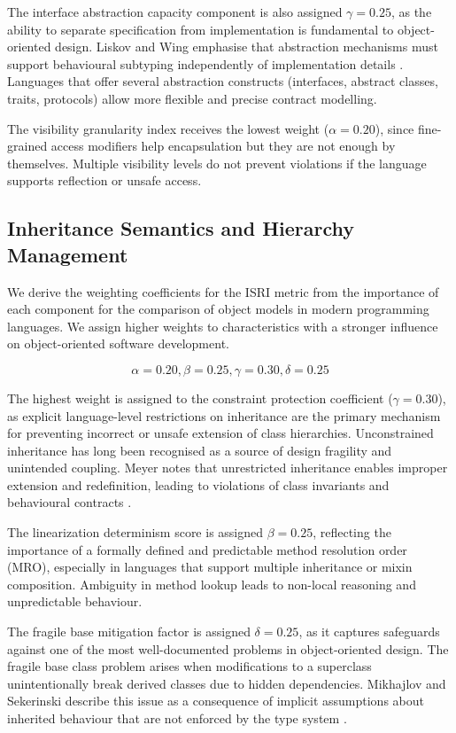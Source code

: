 The interface abstraction capacity component is also assigned $\gamma = 0.25$, as the ability to separate specification from implementation is fundamental to object-oriented design. Liskov and Wing emphasise that abstraction mechanisms must support behavioural subtyping independently of implementation details \cite{liskov1999behavioral}. Languages that offer several abstraction constructs (interfaces, abstract classes, traits, protocols) allow more flexible and precise contract modelling.

The visibility granularity index receives the lowest weight ($\alpha = 0.20$), since fine-grained access modifiers help encapsulation but they are not enough by themselves. Multiple visibility levels do not prevent violations if the language supports reflection or unsafe access.

\subsection{Inheritance Semantics and Hierarchy Management}

We derive the weighting coefficients for the ISRI metric from the importance of each component for the comparison of object models in modern programming languages. We assign higher weights to characteristics with a stronger influence on object-oriented software development.

\[
\alpha = 0.20, \beta = 0.25, \gamma = 0.30, \delta = 0.25
\]

The highest weight is assigned to the constraint protection coefficient ($\gamma = 0.30$), as explicit language-level restrictions on inheritance are the primary mechanism for preventing incorrect or unsafe extension of class hierarchies. Unconstrained inheritance has long been recognised as a source of design fragility and unintended coupling. Meyer notes that unrestricted inheritance enables improper extension and redefinition, leading to violations of class invariants and behavioural contracts \cite{meyer1997object}. 

The linearization determinism score is assigned $\beta = 0.25$, reflecting the importance of a formally defined and predictable method resolution order (MRO), especially in languages that support multiple inheritance or mixin composition. Ambiguity in method lookup leads to non-local reasoning and unpredictable behaviour. 

The fragile base mitigation factor is assigned $\delta = 0.25$, as it captures safeguards against one of the most well-documented problems in object-oriented design. The fragile base class problem arises when modifications to a superclass unintentionally break derived classes due to hidden dependencies. Mikhajlov and Sekerinski describe this issue as a consequence of implicit assumptions about inherited behaviour that are not enforced by the type system \cite{mikhajlov1998study}. 

